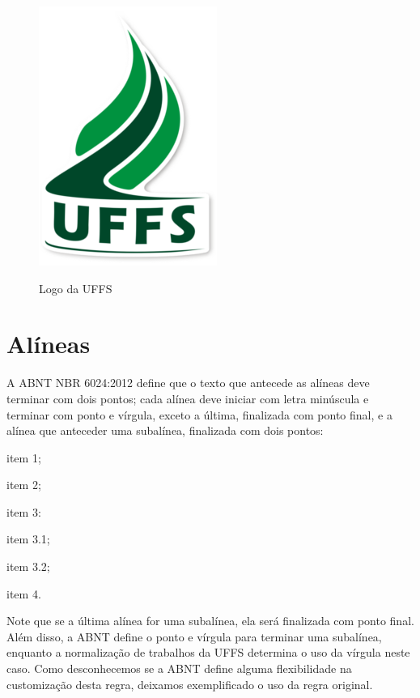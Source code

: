 \documentclass[serif, brazilian]{uffstex}
\begin{document}
\begin{figure}[h]
  \centering
  \caption{Logo da UFFS}
  \includegraphics{logo.png}
  \label{fig:logo_uffs}
\end{figure}

\chapter{Alíneas}

A ABNT NBR 6024:2012 define que o texto que antecede as alíneas deve terminar com dois pontos; cada alínea deve iniciar com letra minúscula e terminar com ponto e vírgula, exceto a última, finalizada com ponto final, e a alínea que anteceder uma subalínea, finalizada com dois pontos:

\begin{alineas}
  \item item 1;
  \item item 2;
  \item item 3:
  \begin{alineas} %
    \item item 3.1;
    \item item 3.2;
  \end{alineas}
  \item item 4.
\end{alineas}

Note que se a última alínea for uma subalínea, ela será finalizada com ponto final. Além disso, a ABNT define o ponto e vírgula para terminar uma subalínea, enquanto a normalização de trabalhos da UFFS determina o uso da vírgula neste caso. Como desconhecemos se a ABNT define alguma flexibilidade na customização desta regra, deixamos exemplificado o uso da regra original.
\end{document}
